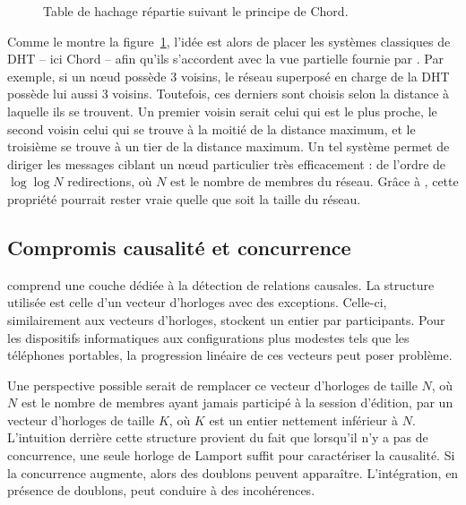 \begin{figure}
  \begin{center}
    
    \caption{\label{conclu:fig:dhtexample}Table de hachage répartie suivant le
      principe de Chord.}
  \end{center}
\end{figure}

Comme le montre la figure~\ref{conclu:fig:dhtexample}, l'idée est alors de
placer les systèmes classiques de DHT -- ici Chord -- afin qu'ils s'accordent
avec la vue partielle fournie par \SPRAY. Par exemple, si un nœud \SPRAY possède
3 voisins, le réseau superposé en charge de la DHT possède lui aussi 3
voisins. Toutefois, ces derniers sont choisis selon la distance à laquelle ils
se trouvent. Un premier voisin serait celui qui est le plus proche, le second
voisin celui qui se trouve à la moitié de la distance maximum, et le troisième
se trouve à un tier de la distance maximum. Un tel système permet de diriger les
messages ciblant un nœud particulier très efficacement : de l'ordre de
$\log\log N$ redirections, où $N$ est le nombre de membres du réseau. Grâce à
\SPRAY, cette propriété pourrait rester vraie quelle que soit la taille du
réseau.



\subsection{Compromis causalité et concurrence}

\CRATE comprend une couche dédiée à la détection de relations causales. La
structure utilisée est celle d'un vecteur d'horloges avec des
exceptions. Celle-ci, similairement aux vecteurs d'horloges, stockent un entier
par participants. Pour les dispositifs informatiques aux configurations plus
modestes tels que les téléphones portables, la progression linéaire de ces
vecteurs peut poser problème. 

Une perspective possible serait de remplacer ce vecteur d'horloges de taille
$N$, où $N$ est le nombre de membres ayant jamais participé à la session
d'édition, par un vecteur d'horloges de taille $K$, où $K$ est un entier
nettement inférieur à $N$. L'intuition derrière cette structure provient du
fait que lorsqu'il n'y a pas de concurrence, une seule horloge de Lamport suffit
pour caractériser la causalité. Si la concurrence augmente, alors des doublons
peuvent apparaître. L'intégration, en présence de doublons, peut conduire à des
incohérences.

